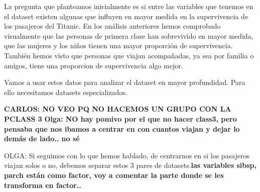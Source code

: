 \documentclass[
]{article}
\newenvironment{Shaded}{\begin{snugshade}}{\end{snugshade}}
\newcommand{\CommentTok}[1]{\textcolor[rgb]{0.50,0.62,0.50}{#1}}
\newcommand{\DecValTok}[1]{\textcolor[rgb]{0.86,0.86,0.80}{#1}}
\newcommand{\NormalTok}[1]{\textcolor[rgb]{0.80,0.80,0.80}{#1}}
\newcommand{\OperatorTok}[1]{\textcolor[rgb]{0.94,0.94,0.82}{#1}}
\newcommand{\StringTok}[1]{\textcolor[rgb]{0.80,0.58,0.58}{#1}}
\begin{document}
La pregunta que planteamos inicialmente es si entre las variables que
tenemos en el dataset existen algunas que influyen en mayor medida en la
supervivencia de los pasajeros del Titanic. En los análisis anteriores
hemos comprobado visualmente que las personas de primera clase han
sobrevivido en mayor medida, que las mujeres y los niños tienen una
mayor proporción de supervivencia. También hemos visto que personas que
viajan acompañadas, ya sea por familia o amigos, tiene una proporcion de
supervivencia algo mejor.

Vamos a usar estos datos para analizar el dataset en mayor profundidad.
Para ello necesitamos datasets especializados.

\textbf{CARLOS: NO VEO PQ NO HACEMOS UN GRUPO CON LA PCLASS 3}
\textbf{Olga: NO hay pomivo por el que no hacer class3, pero pensaba que
nos ibamos a centrar en con cuantos viajan y dejar lo demás de lado.. no
sé }

OLGA: Si seguimos con lo que hemos hablado, de centrarnos en si los
pasajeros viajan solos o no, debemos separar estos 3 pares de
datasets.\textbf{las variables sibsp, parch están como factor, voy a
comentar la parte donde se les transforma en factor..}

\begin{Shaded}
\end{Shaded}

\begin{Shaded}
\end{Shaded}

\begin{Shaded}
\end{Shaded}
\end{document}

